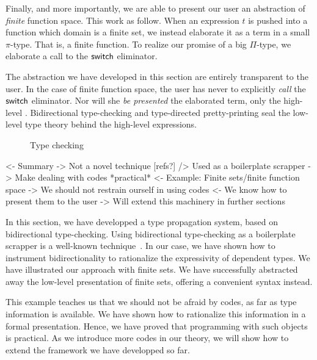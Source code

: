 
Finally, and more importantly, we are able to present our user an
abstraction of \emph{finite} function space. This work as follow. When
an expression $t$ is pushed into a function which domain is a finite
set, we instead elaborate it as a term in a small $\pi$-type. That is,
a finite function. To realize our promise of a big $\Pi$-type, we
elaborate a call to the $\F{switch}$ eliminator. 

The abstraction we have developed in this section are entirely
transparent to the user. In the case of finite function space, the
user has never to explicitly \emph{call} the $\F{switch}$
eliminator. Nor will she \emph{be presented} the elaborated term, only
the high-level . Bidirectional type-checking and type-directed
pretty-printing seal the low-level type theory behind the high-level
expressions.

\begin{figure}

\caption{Type checking}
\label{fig:type-checking}
\end{figure}

\begin{wstructure}
<- Summary
    -> Not a novel technique [refs?]
        /> Used as a boilerplate scrapper
    -> Make dealing with codes *practical*
        <- Example: Finite sets/finite function space
        -> We should not restrain ourself in using codes
            <- We know how to present them to the user
-> Will extend this machinery in further sections
\end{wstructure}

In this section, we have developped a type propagation system, based
on bidirectional type-checking. Using bidirectional type-checking as a
boilerplate scrapper is a well-known technique~\cite{who?}. In our case,
we have shown how to instrument bidirectionality to rationalize the
expressivity of dependent types. We have illustrated our approach with
finite sets. We have successfully abstracted away the low-level
presentation of finite sets, offering a convenient syntax instead.

This example teaches us that we should not be afraid by codes, as far
as type information is available. We have shown how to rationalize
this information in a formal presentation. Hence, we have proved that
programming with such objects is practical. As we introduce more codes
in our theory, we will show how to extend the framework we have
developped so far.
